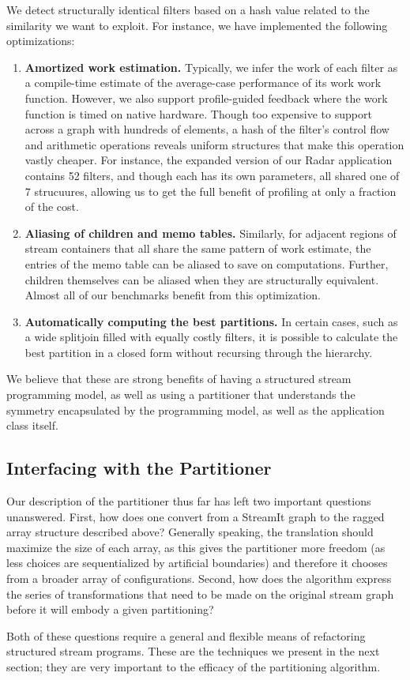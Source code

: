 We detect structurally identical filters based on a hash value related
to the similarity we want to exploit.  For instance, we have
implemented the following optimizations:
\begin{enumerate}

\item {\bf Amortized work estimation.}  Typically, we infer the work
of each filter as a compile-time estimate of the average-case
performance of its work work function.  However, we also support
profile-guided feedback where the work function is timed on native
hardware.  Though too expensive to support across a graph with
hundreds of elements, a hash of the filter's control flow and
arithmetic operations reveals uniform structures that make this
operation vastly cheaper.  For instance, the expanded version of our
Radar application contains 52 filters, and though each has its own
parameters, all shared one of 7 strucuures, allowing us to get the
full benefit of profiling at only a fraction of the cost.

\item {\bf Aliasing of children and memo tables.}  Similarly, for
adjacent regions of stream containers that all share the same pattern
of work estimate, the entries of the memo table can be aliased to save
on computations.  Further, children themselves can be aliased when
they are structurally equivalent.  Almost all of our benchmarks
benefit from this optimization.

\item {\bf Automatically computing the best partitions.}  In certain
cases, such as a wide splitjoin filled with equally costly filters, it
is possible to calculate the best partition in a closed form without
recursing through the hierarchy.
\end{enumerate}

We believe that these are strong benefits of having a structured
stream programming model, as well as using a partitioner that
understands the symmetry encapsulated by the programming model, as
well as the application class itself.

\subsection{Interfacing with the Partitioner}

Our description of the partitioner thus far has left two important
questions unanswered.  First, how does one convert from a StreamIt
graph to the ragged array structure described above?  Generally
speaking, the translation should maximize the size of each array, as
this gives the partitioner more freedom (as less choices are
sequentialized by artificial boundaries) and therefore it chooses from
a broader array of configurations.  Second, how does the algorithm
express the series of transformations that need to be made on the
original stream graph before it will embody a given partitioning?

Both of these questions require a general and flexible means of
refactoring structured stream programs.  These are the techniques we
present in the next section; they are very important to the efficacy
of the partitioning algorithm.
